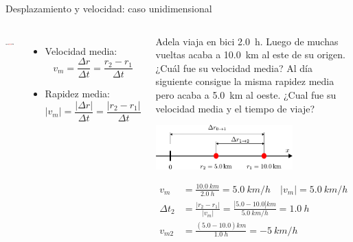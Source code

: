 \documentclass[9pt, aspectratio=169]{beamer}
\begin{document}
\begin{frame}{Desplazamiento y velocidad: caso unidimensional}
\begin{columns}
\cx
\begin{center}
\includegraphics[width=0.9\textwidth]{figs/fig-02.pdf}
\end{center}
\begin{itemize}
\item Velocidad media: \[v_m = \frac{\Delta r}{\Delta t} = \frac{r_2 - r_1}{\Delta t} \]
\item Rapidez media: \[ |v_m| = \frac{|\Delta r|}{\Delta t} = \frac{|r_2 - r_1|}{\Delta t} \]
\end{itemize}
\pause
\cx
\begin{example}
{\small
Adela viaja en bici \qty{2.0}{h}. Luego de muchas vueltas acaba a \qty{10.0}{km} al este de su origen. ¿Cuál fue su velocidad media? Al día siguiente consigue la misma rapidez media pero acaba a \qty{5.0}{km} al oeste. ¿Cual fue su velocidad media y el tiempo de viaje?
\begin{center}
    \includegraphics[width=0.7\textwidth]{figs/fig-03.pdf}
\end{center}
\begin{align*}
    v_m &= \frac{\qty{10.0}{km}}{\qty{2.0}{h}} = \qty{5.0}{km/h} \quad |v_m| = \qty{5.0}{km/h}\\
    \Delta t_2 &= \frac{|r_2 - r_1|}{|v_m|} = \frac{|\num{5.0} - \num{10.0}| \unit{km}}{\qty{5.0}{km/h}} = \qty{1.0}{h} \\
    v_{m2} &= \frac{(\num{5.0} - \num{10.0}) \unit{km}}{\qty{1.0}{h}} = -\qty{5}{km/h}
\end{align*}
}
\end{example}
\end{columns}
\end{frame}
\end{document}

